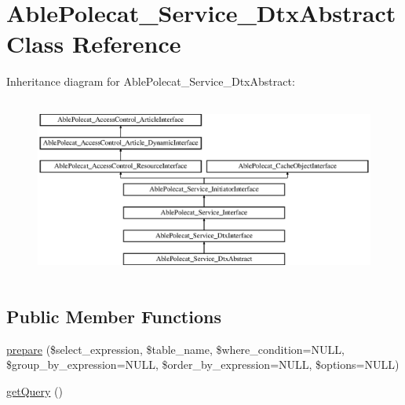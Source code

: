 \hypertarget{class_able_polecat___service___dtx_abstract}{}\section{Able\+Polecat\+\_\+\+Service\+\_\+\+Dtx\+Abstract Class Reference}
\label{class_able_polecat___service___dtx_abstract}
Inheritance diagram for Able\+Polecat\+\_\+\+Service\+\_\+\+Dtx\+Abstract\+:\begin{figure}[H]
\begin{center}
\leavevmode
\includegraphics[height=5.975610cm]{class_able_polecat___service___dtx_abstract}
\end{center}
\end{figure}
\subsection*{Public Member Functions}
\begin{DoxyCompactItemize}
\item 
\hyperlink{class_able_polecat___service___dtx_abstract_a70c9cadf3e9e3b2576447e1667e9d511}{prepare} (\$select\+\_\+expression, \$table\+\_\+name, \$where\+\_\+condition=N\+U\+L\+L, \$group\+\_\+by\+\_\+expression=N\+U\+L\+L, \$order\+\_\+by\+\_\+expression=N\+U\+L\+L, \$options=N\+U\+L\+L)
\item 
\hyperlink{class_able_polecat___service___dtx_abstract_a55f162785567258fe5138af282e588c2}{get\+Query} ()
\end{DoxyCompactItemize}
